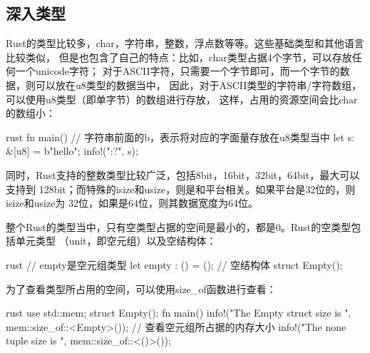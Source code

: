 \subsection{深入类型}
Rust的类型比较多，char，字符串，整数，浮点数等等。这些基础类型和其他语言比较类似，
但是也包含了自己的特点：比如，char类型占据4个字节，可以存放任何一个unicode字符；
对于ASCII字符，只需要一个字节即可，而一个字节的数据，则可以放在u8类型的数据当中，
因此，对于ASCII类型的字符串/字符数组，可以使用u8类型（即单字节）的数组进行存放，
这样，占用的资源空间会比char的数组小：
\begin{code-block}{rust}
fn main() {
    // 字符串前面的b，表示将对应的字面量存放在u8类型当中
    let s: &[u8] = b"hello";
    info!("{:?}", s);
}
\end{code-block}
同时，Rust支持的整数类型比较广泛，包括8bit，16bit，32bit，64bit，最大可以支持到
128bit；而特殊的isize和usize，则是和平台相关。如果平台是32位的，则isize和usize为
32位，如果是64位，则其数据宽度为64位。

整个Rust的类型当中，只有空类型占据的空间是最小的，都是0。Rust的空类型包括单元类型
（unit，即空元组）以及空结构体：
\begin{code-block}{rust}
// empty是空元组类型
let empty : () = ();
// 空结构体
struct Empty();
\end{code-block}
为了查看类型所占用的空间，可以使用size\_of函数进行查看：
\begin{code-block}{rust}
use std::mem;
struct Empty();
fn main() {
    info!("The Empty struct size is {}", mem::size_of::<Empty>());
    // 查看空元组所占据的内存大小
    info!("The none tuple size is {}", mem::size_of::<()>());
}
\end{code-block}

